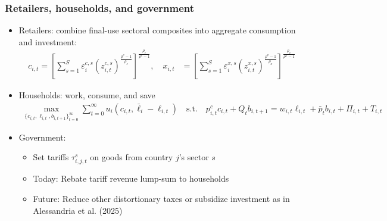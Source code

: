 \documentclass[aspectratio=169,t,10pt,table]{beamer}
\begin{document}
\begin{frame}
  \frametitle{Retailers, households, and government}
  \begin{itemize}\addtolength{\itemsep}{1ex}
  \item Retailers: combine final-use sectoral composites into aggregate consumption and investment:
    \begin{align*}
      c_{i,t} = \left[\sum_{s=1}^S\varepsilon^{c,s}_{i} \left(z^{c,s}_{i,t}\right)^{\frac{\rho^c-1}{\rho_c}}\right]^{\frac{\rho_c}{\rho^c-1}},\quad x_{i,t} &= \left[\sum_{s=1}^S \varepsilon^{x,s}_{i} \left(z^{x,s}_{i,t}\right)^{\frac{\rho^x-1}{\rho_x}}\right]^{\frac{\rho_x}{\rho^x-1}}
    \end{align*}
  \item Households: work, consume, and save
  \begin{align*}
      \max_{\{c_{i,t},\ell_{i,t},b_{i,t+1}\}_{t=0}^\infty} \sum_{t=0}^\infty u_i(c_{i,t},\bar{\ell}_i-\ell_{i,t})\quad \text{s.t.}\quad p^{c}_{i,t} c_{i,t} + Q_t b_{i,t+1} = w_{i,t}\ell_{i,t} + \bar{p}_t b_{i,t} + \Pi_{i,t} + T_{i,t}
  \end{align*}
  \item Government:
  \begin{itemize}\addtolength{\itemsep}{0.5ex}
      \item Set tariffs $\tau^s_{i,j,t}$ on goods from country $j$'s sector $s$
      \item Today: Rebate tariff revenue lump-sum to households
      \item Future: Reduce other distortionary taxes or subsidize investment as in Alessandria et al. (2025)
  \end{itemize}
  \end{itemize}
\end{frame}
\end{document}
